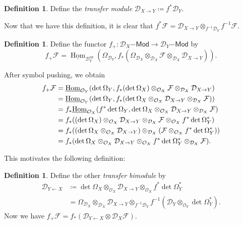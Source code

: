\documentclass[leqno, openany]{memoir}
\theoremstyle{definition}
\newtheorem{defn}[thm]{Definition}
\theoremstyle{remark}
\theoremstyle{plain}
\theoremstyle{definition}
\theoremstyle{remark}
\newcommand{\mc}[1]{\mathcal{#1}}
\newcommand{\mr}[1]{\mathrm{#1}}
\newcommand{\ms}[1]{\mathsf{#1}}
\newcommand{\ul}[1]{\underline{#1}}
\DeclareMathOperator{\Hom}{Hom}
\begin{document}
\begin{defn}
    Define the \textit{transfer module} $\mc{D}_{X \to Y} \coloneqq f^* \mc{D}_Y$.
\end{defn}

Now that we have this definition, it is clear that $f^* \mc{F} = \mc{D}_{X \to Y} \otimes_{f^{-1} \mc{D}_Y} f^{-1} \mc{F}$.

\begin{defn}
    Define the functor $f_+ \colon \mc{D}_X\ms{-Mod} \to \mc{D}_Y\ms{-Mod}$ by
    \[ f_+ \mc{F} = \ul{\Hom}_{\mc{D}_Y^{\mr{op}}}(\Omega_{\mc{D}_Y}, f_* ( \Omega_{\mc{D}_X} \otimes_{\mc{D}_X} \mc{F} \otimes_{\mc{D}_X} \mc{D}_{X \to Y} ) ). \]
\end{defn}

After symbol pushing, we obtain
\begin{align*}
    f_+ \mc{F} &= \ul{\Hom}_{\mc{O}_Y}(\det \Omega_Y, f_* (\det \Omega_X) \otimes_{\mc{O}_X} \mc{F} \otimes_{\mc{D}_X} \mc{D}_{X \to Y}) \\
    &= \ul{\Hom}_{\mc{O}_Y} (\det \Omega_Y, f_*(\det \Omega_X \otimes_{\mc{O}_X} \mc{D}_{X \to Y} \otimes_{\mc{D}_X} \mc{F})) \\
    &= f_* \ul{\Hom}_{\mc{O}_X} (f^* \det \Omega_Y, \det \Omega_X \otimes_{\mc{O}_X} \mc{D}_{X \to Y} \otimes_{\mc{D}_X} \mc{F}) \\
    &= f_* \qty((\det \Omega_X) \otimes_{\mc{O}_X} \mc{D}_{X \to Y} \otimes_{\mc{D}_X} \mc{F} \otimes_{\mc{O}_X} f^* \det \Omega_Y^*) \\
    &= f_* ((\det \Omega_X \otimes_{\mc{O}_X} \mc{D}_{X \to Y}) \otimes_{\mc{D}_X} (\mc{F} \otimes_{\mc{O}_X} f^* \det \Omega_Y^*)) \\
    &= f_* (\det \Omega_X \otimes_{\mc{O}_X} \mc{D}_{X \to Y} \otimes_{\mc{O}_X} f^* \det \Omega_Y^* \otimes_{\mc{D}_X} \mc{F}).
\end{align*}

This motivates the following definition:
\begin{defn}
    Define the other \textit{transfer bimodule} by
    \begin{align*}
        \mc{D}_{Y \gets X} &\coloneqq \det \Omega_X \otimes_{\mc{O}_X} \mc{D}_{X \to Y} \otimes_{\mc{O}_X} f^* \det \Omega_Y^* \\
        &= \Omega_{\mc{D}_X} \otimes_{\mc{D}_X} \mc{D}_{X \to Y} \otimes_{f^{-1} \mc{D}_Y} f^{-1}(\mc{D}_Y \otimes_{\mc{O}_Y} \det \Omega_Y^*).
    \end{align*}
    Now we have $f_+ \mc{F} = f_* (\mc{D}_{Y \gets X} \otimes \mc{D}_X \mc{F})$.
\end{defn}
\end{document}
